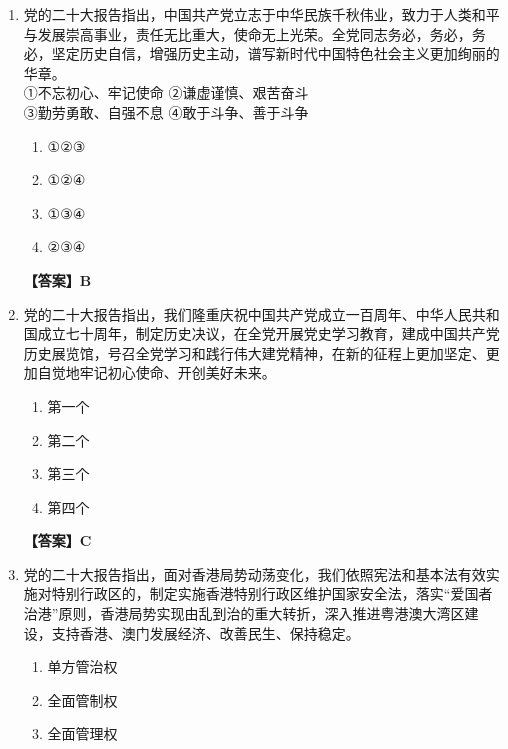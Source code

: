 \documentclass[UTF8,11pt,a4paper]{ctexart}
\begin{document}
\begin{enumerate}[label=\textbf{\arabic*.}, leftmargin=2.5em, itemsep=0.7em]
\begin{enumerate}[label=\Alph*., leftmargin=2em, itemsep=0.1em, topsep=0.15em]
\item 自信自强、守正创新；实现第二个百年奋斗目标
\end{enumerate}
\textbf{【答案】B}
\item 党的二十大报告指出，中国共产党立志于中华民族千秋伟业，致力于人类和平与发展崇高事业，责任无比重大，使命无上光荣。全党同志务必\allowbreak\underline{\hspace{4em}}，务必\allowbreak\underline{\hspace{4em}}，务必\allowbreak\underline{\hspace{4em}}，坚定历史自信，增强历史主动，谱写新时代中国特色社会主义更加绚丽的华章。\\ ①不忘初心、牢记使命 ②谦虚谨慎、艰苦奋斗\\ ③勤劳勇敢、自强不息 ④敢于斗争、善于斗争
\begin{enumerate}[label=\Alph*., leftmargin=2em, itemsep=0.1em, topsep=0.15em]
\item ①②③
\item ①②④
\item ①③④
\item ②③④
\end{enumerate}
\textbf{【答案】B}
\item 党的二十大报告指出，我们隆重庆祝中国共产党成立一百周年、中华人民共和国成立七十周年，制定\allowbreak\underline{\hspace{4em}}历史决议，在全党开展党史学习教育，建成中国共产党历史展览馆，号召全党学习和践行伟大建党精神，在新的征程上更加坚定、更加自觉地牢记初心使命、开创美好未来。
\begin{enumerate}[label=\Alph*., leftmargin=2em, itemsep=0.1em, topsep=0.15em]
\item 第一个
\item 第二个
\item 第三个
\item 第四个
\end{enumerate}
\textbf{【答案】C}
\item 党的二十大报告指出，面对香港局势动荡变化，我们依照宪法和基本法有效实施对特别行政区的\allowbreak\underline{\hspace{4em}}，制定实施香港特别行政区维护国家安全法，落实“爱国者治港”原则，香港局势实现由乱到治的重大转折，深入推进粤港澳大湾区建设，支持香港、澳门发展经济、改善民生、保持稳定。
\begin{enumerate}[label=\Alph*., leftmargin=2em, itemsep=0.1em, topsep=0.15em]
\item 单方管治权
\item 全面管制权
\item 全面管理权

\end{enumerate}
\end{enumerate}
\end{document}
